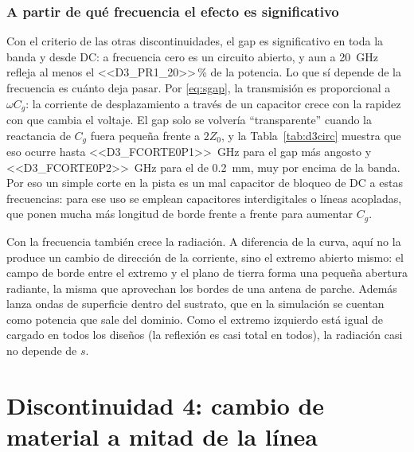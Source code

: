 \documentclass[11pt,letterpaper]{article}
\begin{document}
\subsubsection{A partir de qué frecuencia el efecto es significativo}
Con el criterio de las otras discontinuidades, el gap es significativo en toda la banda y desde DC: a frecuencia cero es un circuito abierto, y aun a \SI{20}{GHz} refleja al menos el <<D3_PR1_20>>\,\% de la potencia. Lo que sí depende de la frecuencia es cuánto deja pasar. Por \eqref{eq:sgap}, la transmisión es proporcional a $\omega C_g$: la corriente de desplazamiento a través de un capacitor crece con la rapidez con que cambia el voltaje. El gap solo se volvería ``transparente'' cuando la reactancia de $C_g$ fuera pequeña frente a $2Z_0$, y la Tabla~\ref{tab:d3circ} muestra que eso ocurre hasta \SI{<<D3_FCORTE0P1>>}{GHz} para el gap más angosto y \SI{<<D3_FCORTE0P2>>}{GHz} para el de \SI{0.2}{mm}, muy por encima de la banda. Por eso un simple corte en la pista es un mal capacitor de bloqueo de DC a estas frecuencias: para ese uso se emplean capacitores interdigitales o líneas acopladas, que ponen mucha más longitud de borde frente a frente para aumentar $C_g$.

Con la frecuencia también crece la radiación. A diferencia de la curva, aquí no la produce un cambio de dirección de la corriente, sino el extremo abierto mismo: el campo de borde entre el extremo y el plano de tierra forma una pequeña abertura radiante, la misma que aprovechan los bordes de una antena de parche. Además lanza ondas de superficie dentro del sustrato, que en la simulación se cuentan como potencia que sale del dominio. Como el extremo izquierdo está igual de cargado en todos los diseños (la reflexión es casi total en todos), la radiación casi no depende de $s$.

\section{Discontinuidad 4: cambio de material a mitad de la línea}
\label{sec:d4}
\end{document}
